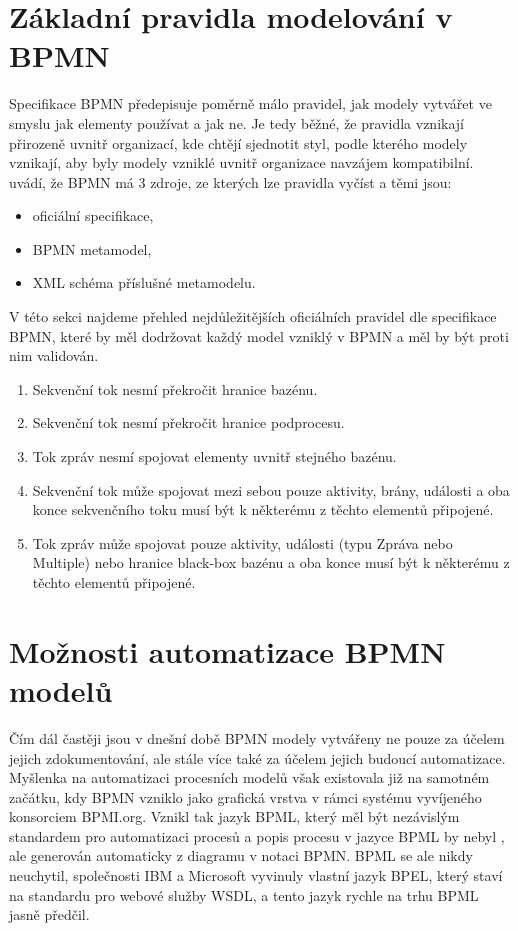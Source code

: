 \documentclass[]{article}
\begin{document}
\section{Základní pravidla modelování v BPMN}
Specifikace BPMN předepisuje poměrně málo pravidel, jak modely vytvářet ve smyslu jak elementy používat a jak ne. Je tedy běžné, že pravidla vznikají přirozeně uvnitř organizací, kde chtějí sjednotit styl, podle kterého modely vznikají, aby byly modely vzniklé uvnitř organizace navzájem kompatibilní.\cite{Silver2011} uvádí, že BPMN má 3 zdroje, ze kterých lze pravidla vyčíst a těmi jsou:

\begin{itemize}
\item oficiální specifikace,
\item BPMN metamodel,
\item XML schéma příslušné metamodelu.
\end{itemize}

V této sekci najdeme přehled nejdůležitějších oficiálních pravidel dle specifikace BPMN, které by měl dodržovat každý model vzniklý v BPMN a měl by být proti nim validován.

\begin{enumerate}
\item Sekvenční tok nesmí překročit hranice bazénu.
\item Sekvenční tok nesmí překročit hranice podprocesu.
\item Tok zpráv nesmí spojovat elementy uvnitř stejného bazénu.
\item Sekvenční tok může spojovat mezi sebou pouze aktivity, brány, události a oba konce sekvenčního toku musí být k některému z těchto elementů připojené.
\item Tok zpráv může spojovat pouze aktivity, události (typu Zpráva nebo Multiple) nebo hranice black-box bazénu a oba konce musí být k některému z těchto elementů připojené.
\end{enumerate}

\section{Možnosti automatizace BPMN modelů}
Čím dál častěji jsou v dnešní době BPMN modely vytvářeny ne pouze za účelem jejich zdokumentování, ale stále více také za účelem jejich budoucí automatizace. \cite{Leymann2009} Myšlenka na automatizaci procesních modelů však existovala již na samotném začátku, kdy BPMN vzniklo jako grafická vrstva v rámci systému vyvíjeného konsorciem BPMI.org. \cite{Silver2011} Vznikl tak jazyk BPML, který měl být nezávislým standardem pro automatizaci procesů a popis procesu v jazyce BPML by nebyl , ale generován automaticky z diagramu v notaci BPMN. BPML se ale nikdy neuchytil, společnosti IBM a Microsoft vyvinuly vlastní jazyk BPEL, který staví na standardu pro webové služby WSDL, a tento jazyk rychle na trhu BPML jasně předčil.
\end{document}
